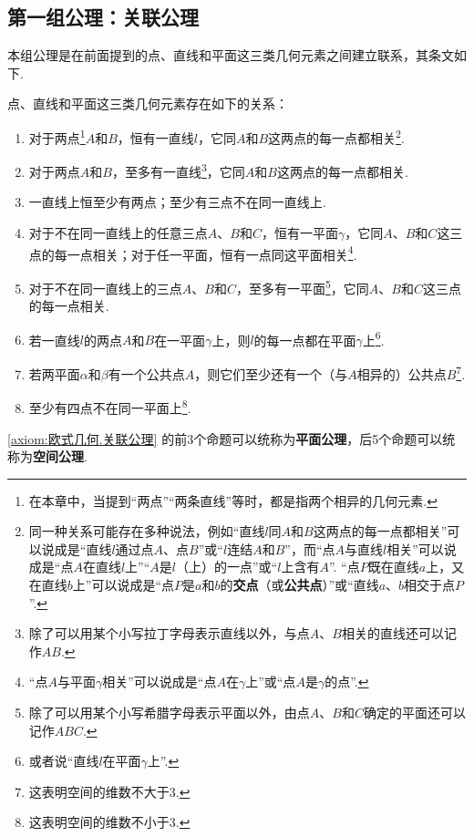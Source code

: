 \subsection{第一组公理：关联公理}
本组公理是在前面提到的点、直线和平面这三类几何元素之间建立联系，其条文如下.
\begin{axiom}[关联公理]\label{axiom:欧式几何.关联公理}
点、直线和平面这三类几何元素存在如下的关系：
\begin{enumerate}
\item 对于两点\footnote{%
在本章中，当提到“两点”“两条直线”等时，都是指两个相异的几何元素.%
}\(A\)和\(B\)，恒有一直线\(l\)，它同\(A\)和\(B\)这两点的每一点都相关\footnote{%
同一种关系可能存在多种说法，例如“直线\(l\)同\(A\)和\(B\)这两点的每一点都相关”可以说成是“直线\(l\)通过点\(A\)、点\(B\)”或“\(l\)连结\(A\)和\(B\)”，而“点\(A\)与直线\(l\)相关”可以说成是“点\(A\)在直线\(l\)上”“\(A\)是\(l\)（上）的一点”或“\(l\)上含有\(A\)”.%
“点\(P\)既在直线\(a\)上，又在直线\(b\)上”可以说成是“点\(P\)是\(a\)和\(b\)的\textbf{交点}（或\textbf{公共点}）”或“直线\(a\)、\(b\)相交于点\(P\)”.%
}.

\item 对于两点\(A\)和\(B\)，至多有一直线\footnote{%
除了可以用某个小写拉丁字母表示直线以外，与点\(A\)、\(B\)相关的直线还可以记作\(AB\).%
}，它同\(A\)和\(B\)这两点的每一点都相关.

\item 一直线上恒至少有两点；至少有三点不在同一直线上.

\item 对于不在同一直线上的任意三点\(A\)、\(B\)和\(C\)，恒有一平面\(\gamma\)，它同\(A\)、\(B\)和\(C\)这三点的每一点相关；对于任一平面，恒有一点同这平面相关\footnote{%
“点\(A\)与平面\(\gamma\)相关”可以说成是“点\(A\)在\(\gamma\)上”或“点\(A\)是\(\gamma\)的点”.%
}.

\item 对于不在同一直线上的三点\(A\)、\(B\)和\(C\)，至多有一平面\footnote{%
除了可以用某个小写希腊字母表示平面以外，由点\(A\)、\(B\)和\(C\)确定的平面还可以记作\(ABC\).%
}，它同\(A\)、\(B\)和\(C\)这三点的每一点相关.

\item 若一直线\(l\)的两点\(A\)和\(B\)在一平面\(\gamma\)上，则\(l\)的每一点都在平面\(\gamma\)上\footnote{%
或者说“直线\(l\)在平面\(\gamma\)上”.%
}.

\item 若两平面\(\alpha\)和\(\beta\)有一个公共点\(A\)，则它们至少还有一个（与\(A\)相异的）公共点\(B\)\footnote{%
这表明空间的维数不大于3.%
}.

\item 至少有四点不在同一平面上\footnote{%
这表明空间的维数不小于3.%
}.
\end{enumerate}
\end{axiom}
\cref{axiom:欧式几何.关联公理} 的前3个命题可以统称为\textbf{平面公理}，后5个命题可以统称为\textbf{空间公理}.

